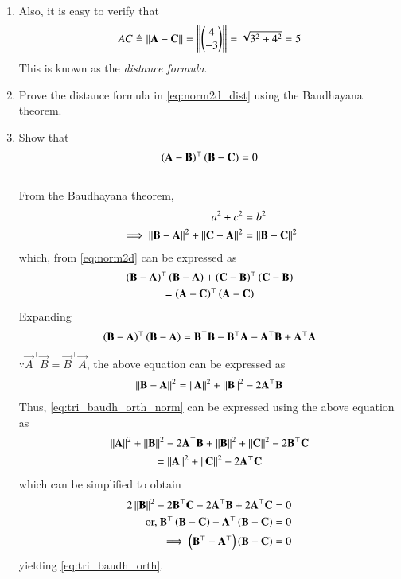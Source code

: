 \begin{enumerate}[label=\thesection.\arabic*.,ref=\thesection.\theenumi]
\item Also, it is easy to verify that
%
\begin{align}
\label{eq:tri_norm_dist}
AC \triangleq  \left\lVert\mathbf{A}-\mathbf{C}\right\rVert =  \left\lVert\begin{pmatrix}4\\-3\end{pmatrix}\right\rVert = \sqrt{3^2+4^2} = 5
\end{align}
%
This is known as the {\em distance formula}.
\fi
%
\item Prove the distance formula in 
  \eqref{eq:norm2d_dist}
 using the Baudhayana theorem.
%
\item Show that 
\label{them:tri_baudh_orth}
\begin{align}
\label{eq:tri_baudh_orth}
\left(\mathbf{A}-\mathbf{B}\right)^{\top}\left(\mathbf{B}-\mathbf{C}\right) = 0
\end{align}
\\
\solution From the Baudhayana theorem,
\begin{align}
a^2+c^2 &= b^2
\\
\implies \left\lVert\mathbf{B}-\mathbf{A}\right\rVert^2+\left\lVert\mathbf{C}-\mathbf{A}\right\rVert^2&=\left\lVert\mathbf{B}-\mathbf{C}\right\rVert^2
\label{eq:tri_baudh_orth_norm}
\end{align}
which, from 
  \eqref{eq:norm2d}
 can be expressed as
\begin{multline}
\left(\mathbf{B}-\mathbf{A}\right)^{\top}\left(\mathbf{B}-\mathbf{A}\right)
+
\left(\mathbf{C}-\mathbf{B}\right)^{\top}\left(\mathbf{C}-\mathbf{B}\right)
\\
=
\left(\mathbf{A}-\mathbf{C}\right)^{\top}\left(\mathbf{A}-\mathbf{C}\right)
\end{multline}
%
Expanding
\begin{multline}
\left(\mathbf{B}-\mathbf{A}\right)^{\top}\left(\mathbf{B}-\mathbf{A}\right) 
= \mathbf{B}^{\top}\mathbf{B} - \mathbf{B}^{\top}\mathbf{A} - \mathbf{A}^{\top}\mathbf{B}+\mathbf{A}^{\top}\mathbf{A}
\end{multline}
$\because \vec{A}^{\top}\vec{B} = \vec{B}^{\top}\vec{A}$, the above equation can be expressed as
\begin{align}
\left\lVert\mathbf{B}-\mathbf{A}\right\rVert^2 = 
\left\lVert\mathbf{A}\right\rVert^2 + \left\lVert\mathbf{B}\right\rVert^2 - 2\mathbf{A}^{\top}\mathbf{B}
\end{align}
%
Thus, \eqref{eq:tri_baudh_orth_norm} can be expressed using the above equation as
\begin{multline}
\left\lVert\mathbf{A}\right\rVert^2 + \left\lVert\mathbf{B}\right\rVert^2 - 2\mathbf{A}^{\top}\mathbf{B}
+
\left\lVert\mathbf{B}\right\rVert^2 + \left\lVert\mathbf{C}\right\rVert^2 - 2\mathbf{B}^{\top}\mathbf{C}
\\
=
\left\lVert\mathbf{A}\right\rVert^2 + \left\lVert\mathbf{C}\right\rVert^2 - 2\mathbf{A}^{\top}\mathbf{C}
\end{multline}
%
which can be simplified to obtain
%
\begin{align}
2\left\lVert\mathbf{B}\right\rVert^2 - 2\mathbf{B}^{\top}\mathbf{C}
- 2\mathbf{A}^{\top}\mathbf{B}+ 2\mathbf{A}^{\top}\mathbf{C}
=0
\\
\text{or, } \mathbf{B}^{\top}\left(\mathbf{B}-\mathbf{C}\right)
-\mathbf{A}^{\top}\left(\mathbf{B}-\mathbf{C}\right) = 0
\\
\implies \left(\mathbf{B}^{\top}-\mathbf{A}^{\top}\right)\left(\mathbf{B}-\mathbf{C}\right) = 0
\end{align}
yielding \eqref{eq:tri_baudh_orth}.
\end{enumerate}
\fi
